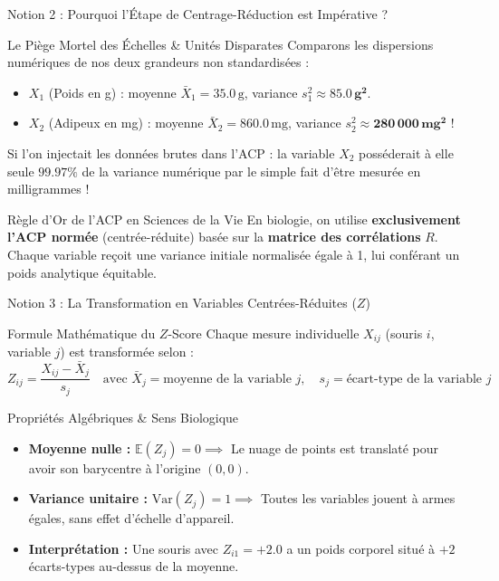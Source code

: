 \documentclass[aspectratio=169,10pt]{beamer}
\begin{document}
\begin{frame}{Notion 2 : Pourquoi l'Étape de Centrage-Réduction est Impérative ?}
  \begin{warnbox}{Le Piège Mortel des Échelles \& Unités Disparates}
    \footnotesize
    Comparons les dispersions numériques de nos deux grandeurs non standardisées :
    \begin{itemize}
      \item $X_1$ (Poids en g) : moyenne $\bar{X}_1 = 35.0\,\text{g}$, variance $s_1^2 \approx \mathbf{85.0\,\text{g}^2}$.
      \item $X_2$ (Adipeux en mg) : moyenne $\bar{X}_2 = 860.0\,\text{mg}$, variance $s_2^2 \approx \mathbf{280\,000\,\text{mg}^2}$ !
    \end{itemize}
    Si l'on injectait les données brutes dans l'ACP : la variable $X_2$ posséderait à elle seule $99.97\%$ de la variance numérique par le simple fait d'être mesurée en milligrammes !
  \end{warnbox}
  \vspace{1mm}
  \begin{takeawaybox}{Règle d'Or de l'ACP en Sciences de la Vie}
    \footnotesize
    En biologie, on utilise \textbf{exclusivement l'ACP normée} (centrée-réduite) basée sur la \textbf{matrice des corrélations} $R$. Chaque variable reçoit une variance initiale normalisée égale à 1, lui conférant un poids analytique équitable.
  \end{takeawaybox}
\end{frame}

\begin{frame}{Notion 3 : La Transformation en Variables Centrées-Réduites ($Z$)}
  \begin{conceptbox}{Formule Mathématique du $Z$-Score}
    \footnotesize
    Chaque mesure individuelle $X_{ij}$ (souris $i$, variable $j$) est transformée selon :
    \begin{equation*}
      Z_{ij} = \frac{X_{ij} - \bar{X}_j}{s_j} \quad \text{avec } \bar{X}_j = \text{moyenne de la variable } j, \quad s_j = \text{écart-type de la variable } j
    \end{equation*}
  \end{conceptbox}
  \vspace{1mm}
  \begin{biobox}{Propriétés Algébriques \& Sens Biologique}
    \footnotesize
    \begin{itemize}
      \item \textbf{Moyenne nulle :} $\mathbb{E}(Z_j) = 0 \implies$ Le nuage de points est translaté pour avoir son barycentre à l'origine $(0,0)$.
      \item \textbf{Variance unitaire :} $\text{Var}(Z_j) = 1 \implies$ Toutes les variables jouent à armes égales, sans effet d'échelle d'appareil.
      \item \textbf{Interprétation :} Une souris avec $Z_{i1} = +2.0$ a un poids corporel situé à $+2$ écarts-types au-dessus de la moyenne.
    \end{itemize}
  \end{biobox}
\end{frame}
\end{document}
